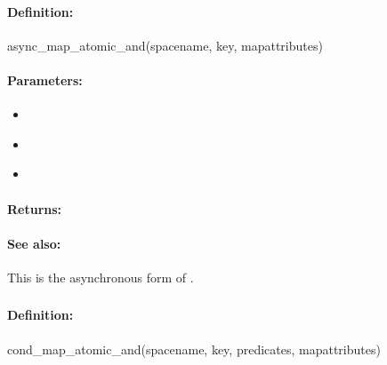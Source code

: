 \paragraph{Definition:}
\begin{rubycode}
async_map_atomic_and(spacename, key, mapattributes)
\end{rubycode}

\paragraph{Parameters:}
\begin{itemize}[noitemsep]
\item {}\\

\item {}\\

\item {}\\

\end{itemize}

\paragraph{Returns:}


\paragraph{See also:}  This is the asynchronous form of .

\pagebreak
\subsubsection{}
\label{api:ruby:cond_map_atomic_and}


\paragraph{Definition:}
\begin{rubycode}
cond_map_atomic_and(spacename, key, predicates, mapattributes)
\end{rubycode}

